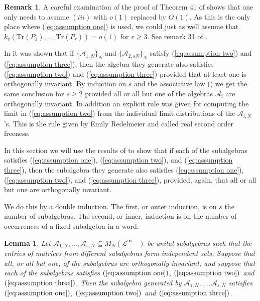 \documentclass[11pt]{amsart}
\newtheorem{lemma}[theorem]{Lemma}
\theoremstyle{definition}
\newtheorem{remark}[theorem]{Remark}
\numberwithin{theorem}{section}
\newcommand{\cA}{\mathcal{A}}
\newcommand{\cL}{\mathcal{L}}
\newcommand{\sN}{{\scriptscriptstyle N}}
\newcommand{\Tr}{\mathrm{Tr}}
\begin{document}
\begin{remark}
A careful examination of the proof of Theorem 41 of
\cite{mp} shows that one only needs to assume $(iii)$ with
$o(1)$ replaced by $O(1)$. As this is the only place where
(\ref{eq:assumption one}) is used, we could just as well
assume that $k_r(\Tr(P_1), \dots, \Tr(P_r)) = o(1)$ for $r
\geq 3$. See remark 31 of \cite{mp}.

In \cite[Theorem 54]{mp} it was shown that if $\{\cA_{1,
  \sN}\}_\sN$ and $\{\cA_{2, sN}\}_\sN$ satisfy
(\ref{eq:assumption two}) and (\ref{eq:assumption three}),
then the algebra they generate also satisfies
(\ref{eq:assumption two}) and (\ref{eq:assumption three})
provided that at least one is orthogonally invariant. By
induction on $s$ and the associative law
(\cite[Prop. 29]{mp}) we get the same conclusion for $s \geq
2$ provided all or all but one of the algebras $\cA_i$ are
orthogonally invariant. In addition an explicit rule was
given for computing the limit in (\ref{eq:assumption two})
from the individual limit distributions of the $\cA_{i,
  \sN}$'s. This is the rule given by Emily Redelmeier
\cite{r} and called real second order freeness.
\end{remark}



In this section we will use the results of \cite{mp} to show
that if each of the subalgebras satisfies
(\ref{eq:assumption one}), (\ref{eq:assumption two}), and
(\ref{eq:assumption three}), then the subalgebra they
generate also satisfies (\ref{eq:assumption one}),
(\ref{eq:assumption two}), and (\ref{eq:assumption three}),
provided, again, that all or all but one are orthogonally
invariant.

We do this by a double induction. The first, or outer
induction, is on $s$ the number of subalgebras. The second,
or inner, induction is on the number of occurrences of a
fixed subalgebra in a word.



\begin{lemma}\label{lemma:outside induction}
Let $\cA_{1, \sN}, \dots, \cA_{s, \sN} \subseteq
M_N(\cL^{\infty-})$ be unital subalgebras such that the
entries of matrices from different subalgebras form
independent sets. Suppose that all, or all but one, of the
subalgebras are orthogonally invariant, and suppose that
each of the subalgebras satisfies $(\ref{eq:assumption
  one})$, $(\ref{eq:assumption two})$ and
$(\ref{eq:assumption three})$. Then the subalgebra generated
by $\cA_{1, \sN}, \dots, \cA_{s, \sN}$ satisfies
$(\ref{eq:assumption one})$, $(\ref{eq:assumption two})$ and
$(\ref{eq:assumption three})$.
\end{lemma}
\end{document}
